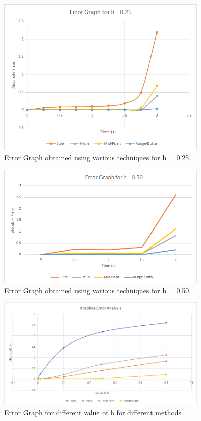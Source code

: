 \documentclass[titlepage, 11pt]{article}
\begin{document}
\begin{itemize}
\begin{figure}[!tbh]
  	\includegraphics[width=0.9\textwidth]{EG0.25.png} 
  	\caption{Error Graph obtained using various techniques for h = 0.25.}
  	\label{fig:q112b} 
\end{figure}
\begin{figure}[!tbh]
  	\centering
  	\includegraphics[width=0.9\textwidth]{EG0.50.png} 
  	\caption{Error Graph obtained using various techniques for h = 0.50.}
  	\label{fig:q112c} 
\end{figure}
\begin{figure}[!tbh]
  	\centering
  	\includegraphics[width=0.9\textwidth]{Error_Graph.png} 
  	\caption{Error Graph for different value of h for different methods.}
  	\label{fig:q112d} 
\end{figure}
\end{itemize}
\end{document}
